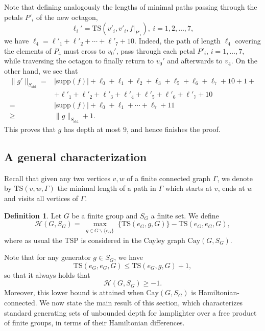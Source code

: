 \documentclass[reqno,oneside]{amsart}
\newcommand{\cay}[2]{\mathrm{Cay}(#1,#2)}
\newcommand{\supp}[1]{\mathrm{supp}(#1)}
\newcommand{\std}{S_{\mathrm{std}}}
\newcommand{\TS}[3]{\mathrm{TS}\left(#1,#2,#3\right)}
\theoremstyle{plain}
\theoremstyle{definition}
\newtheorem{defn}[thm]{Definition} %
\begin{document}
\begin{itemize}
	Note that defining analogously the lengths of minimal paths passing through the petals $P'_i$ of the new octagon, 
	$$\ell_i'=\TS{v'_i}{v'_i}{f|_{P'_i}}, \ i=1,2,\ldots,7,
	$$
	we have $\ell_4=\ell'_1+\ell'_2+\cdots+\ell'_7+10$. Indeed, the path of length $\ell_4$ covering the elements of $P_4$ must cross to $v_0'$, pass through each petal $P'_i$, $i=1,\ldots,7$,  while traversing the octagon to finally return to $v_0'$ and afterwards to $v_4$. On the other hand, we see that
	\begin{align*}
	\|g'\|_{\std}=&\left|\supp{f}\right|+\ell_0+\ell_1+\ell_2+\ell_3+\ell_5+\ell_6+\ell_7+10+1+\\
	&+ \ell'_1+\ell'_2+\ell'_3+\ell'_4+\ell'_5+\ell'_6+\ell'_7+10\\
	=&\left|\supp{f}\right|+\ell_0+\ell_1+\cdots+\ell_7+11\\
	\ge&\|g\|_{\std}+1.
	\end{align*}
	This proves that $g$ has depth at most $9$, and hence finishes the proof.
	
\end{itemize}


\subsection{A general characterization}

Recall that given any two vertices $v,w$ of a finite connected graph $\Gamma$, we denote by $\TS{v}{w}{\Gamma}$ the minimal length of a path in $\Gamma$ which starts at $v$, ends at $w$ and visits all vertices of $\Gamma$.
\begin{defn}\label{def: new constant hamiltonicity finite groups} Let $G$ be a finite group and $S_G$ a finite set. We define
	$$
	\mathscr{H}(G,S_G)=	\max_{\substack{g\in G\backslash\{e_G\}}} \Big\{ \TS{e_G}{g}{G} \Big\} - \TS{e_G}{e_G}{G},
	$$
	where as usual the TSP is considered in the Cayley graph $\cay{G}{S_G}$.
	
\end{defn}

Note that for any generator $g\in S_G$, we have 
$$
\TS{e_G}{e_G}{G}\le \TS{e_G}{g}{G}+1,
$$
so that it always holds that $$\mathscr{H}(G,S_G)\ge -1.$$ Moreover, this lower bound is attained when $\cay{G}{S_G}$ is Hamiltonian-connected. We now state the main result of this section, which characterizes standard generating sets of unbounded depth for lamplighter over a free product of finite groups, in terms of their Hamiltonian differences.
\end{document}
